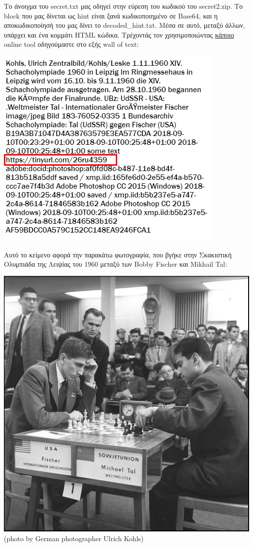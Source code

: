 \documentclass{article}
\newcommand{\lt}[1]{\latintext #1\greektext}
\begin{document}
Το άνοιγμα του \lt{secret.txt} μας οδηγεί στην εύρεση του κωδικού του \lt{secret2.zip}. Το \lt{block} που μας δίνεται ως \lt{hint} είναι ξανά κωδικοποιημένο σε \lt{Base64}, και η αποκωδικοποίησή του μας δίνει το \lt{decoded\_hint.txt}. Μέσα σε αυτό, μεταξύ άλλων, υπάρχει και ένα κομμάτι \lt{HTML} κώδικα. Τρέχοντάς τον χρησιμοποιώντας \href{https://onecompiler.com/html}{κάποιο} \lt{online tool} οδηγούμαστε στο εξής \lt{wall of text}:
\begin{center}
    \includegraphics[scale=0.6]{files/tal_fischer_final_1960.png}
\end{center}

\newpage

Αυτό το κείμενο αφορά την παρακάτω φωτογραφία, που βγήκε στην Σκακιστική Ολυμπιάδα της Λειψίας του 1960 μεταξύ των \lt{Bobby Fischer} και \lt{Mikhail Tal}:
\begin{center}
    \includegraphics[scale=0.5]{files/bobby_vs_misha.png}\\
    \lt{\large(photo by German photographer Ulrich Kohls)}
\end{center}
\end{document}
